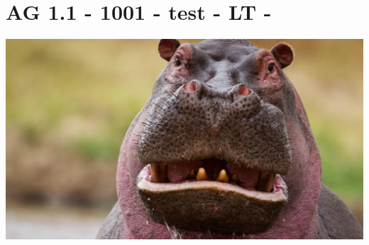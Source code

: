 \section{AG 1.1 - 1001 - test - LT - }

\begin{beispiel}[AG 1.1]{1}
\includegraphics{../_database_inoffiziell/Bilder/AG11_1001_hippo.eps}
\end{beispiel}
